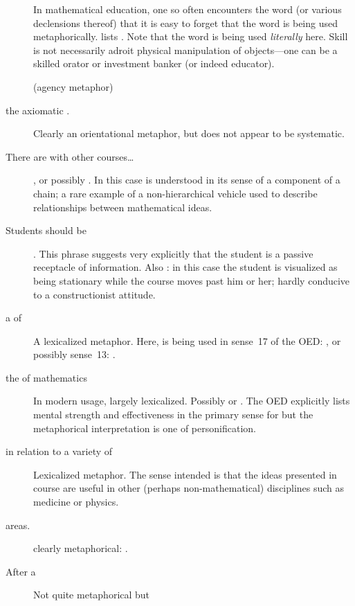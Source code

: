 \begin{description}
  In mathematical education, one so often encounters the
  word  (or various declensions thereof) that it is
  easy to forget that the word is being used metaphorically.
   lists .  Note that the word  is being used
  \emph{literally} here.  Skill is not necessarily adroit physical
  manipulation of objects---one can be a skilled orator or investment
  banker (or indeed educator).
\item[\metaphor{by its use of}]\qquad(agency metaphor)
\item[the axiomatic \metaphor{approach}.]\qquad Clearly an orientational
  metaphor, but does not appear to be systematic.
\item[There are \metaphor{links} with other
  courses\ldots]\qquad{}, or possibly
  .  In this case  is
  understood in its sense of a component of a chain; a rare example of
  a non-hierarchical vehicle used to describe relationships between
  mathematical ideas.
\item[Students should be \metaphor{left with}]\qquad{}.  This phrase suggests very explicitly that the
  student is a passive receptacle of information.  Also : in this case the student is visualized as
  being stationary while the course moves past him or her; hardly
  conducive to a constructionist attitude.
\item[a \metaphor{sense} of]\qquad A lexicalized metaphor.  Here,
   is being used in sense~17 of the OED:
  , or possibly sense~13:
  .
\item[the \metaphor{power} of mathematics]\qquad In modern usage,
  largely lexicalized.  Possibly  or
  .  The OED explicitly lists mental
  strength and effectiveness in the primary sense for 
  but the metaphorical interpretation is one of personification.
\item[in relation to a variety of \metaphor{application}]\qquad
  Lexicalized metaphor.  The sense intended is that the ideas
  presented in course are useful in other (perhaps non-mathematical)
  disciplines such as medicine or physics.
\item[areas.]\qquad clearly metaphorical: .
\item[After a \metaphor{discussion}]\qquad Not quite metaphorical but

\end{description}
